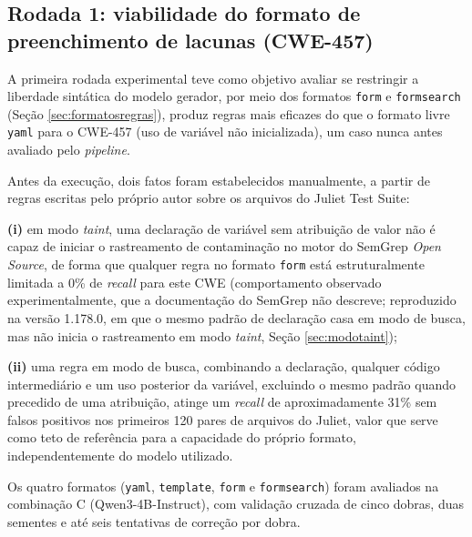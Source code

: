 \documentclass[
    12pt,                %
    openright,           %
    oneside,             %
    a4paper,             %
    english,             %
    brazil               %
]{abntex2}
\newcommand{\novo}[1]{{\color{red}#1}}
\begin{document}
\subsection{Rodada 1: viabilidade do formato de preenchimento de lacunas (CWE-457)}
\label{sec:rodada1}
\par
A primeira rodada experimental teve como objetivo avaliar se restringir a liberdade sintática do modelo gerador, por meio dos formatos \texttt{form} e \texttt{formsearch} (Seção \ref{sec:formatosregras}), produz regras mais eficazes do que o formato livre \texttt{yaml} para o CWE-457 (uso de variável não inicializada), um caso nunca antes avaliado pelo \textit{pipeline}.
\par
Antes da execução, dois fatos foram estabelecidos manualmente, a partir de regras escritas pelo próprio autor sobre os arquivos do Juliet Test Suite: 
\par
\textbf{(i)} em modo \textit{taint}, uma declaração de variável sem atribuição de valor não é capaz de iniciar o rastreamento de contaminação no motor do SemGrep \textit{Open Source}, de forma que qualquer regra no formato \texttt{form} está estruturalmente limitada a 0\% de \textit{recall} para este CWE\novo{ (comportamento observado experimentalmente, que a documentação do SemGrep não descreve; reproduzido na versão 1.178.0, em que o mesmo padrão de declaração casa em modo de busca, mas não inicia o rastreamento em modo \textit{taint}, Seção \ref{sec:modotaint})};
\par
\textbf{(ii)} uma regra em modo de busca, combinando a declaração, qualquer código intermediário e um uso posterior da variável, excluindo o mesmo padrão quando precedido de uma atribuição, atinge um \textit{recall} de aproximadamente 31\% sem falsos positivos nos primeiros 120 pares de arquivos do Juliet, valor que serve como teto de referência para a capacidade do próprio formato, independentemente do modelo utilizado.
\par
Os quatro formatos (\texttt{yaml}, \texttt{template}, \texttt{form} e \texttt{formsearch}) foram avaliados na combinação C (Qwen3-4B-Instruct), com validação cruzada de cinco dobras, duas sementes e até seis tentativas de correção por dobra.
\end{document}

